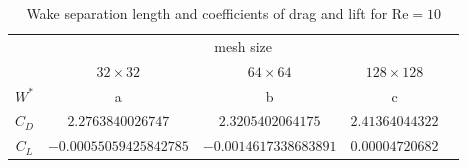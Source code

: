 	\begin{table}[htp]
		\centering
		\begin{tabular}{|c||c|c|c|c}
			\cline{1-4}
			\rule{0pt}{2,3ex}\multirow{2}{*}{}   & \multicolumn{3}{c|}{mesh size} &  \\ \cline{2-4}
			\rule{0pt}{2,3ex}& $32 \times 32$       & $64 \times 64$       & $128 \times 128$      &  \\ \cline{1-4}
			\rule{0pt}{2,3ex}$W^*$ 				 & a        & b        & c        &  \\ \cline{1-4}
			\rule{0pt}{2,3ex}$C_D$                & $2.2763840026747$        & $2.3205402064175$        & $2.41364044322$        &  \\ \cline{1-4}
			\rule{0pt}{2,3ex}$C_L$                & $-0.00055059425842785$        & $-0.0014617338683891$        & $0.00004720682$        &  \\ \cline{1-4}
		\end{tabular}
		\caption{Wake separation length and coefficients of drag and lift for $\text{Re}=10$}
		\label{tab:re10}
	\end{table}
	
